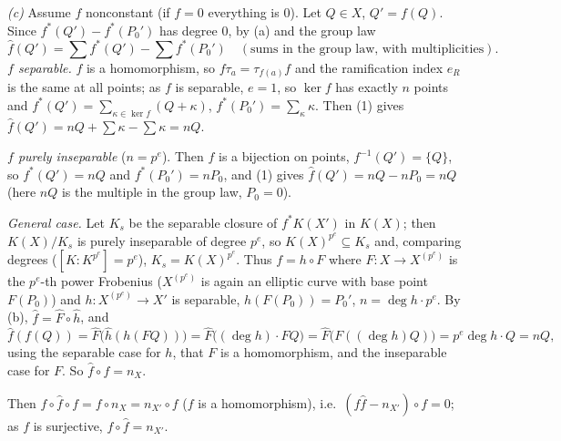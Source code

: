 \documentclass[11pt]{article}
\begin{document}
\emph{(c)} Assume $f$ nonconstant (if $f=0$ everything is $0$). Let $Q\in X$, $Q'=f(Q)$. Since $f^*(Q')-f^*(P_0')$ has degree $0$, by (a) and the group law
\[ \hat f(Q')=\sum f^*(Q')-\sum f^*(P_0')\quad(\text{sums in the group law, with multiplicities}).\tag{1}\]
\emph{$f$ separable.} $f$ is a homomorphism, so $f\tau_a=\tau_{f(a)}f$ and the ramification index $e_R$ is the same at all points; as $f$ is separable, $e=1$, so $\ker f$ has exactly $n$ points and $f^*(Q')=\sum_{\kappa\in\ker f}(Q+\kappa)$, $f^*(P_0')=\sum_{\kappa}\kappa$. Then (1) gives $\hat f(Q')=nQ+\sum\kappa-\sum\kappa=nQ$.

\emph{$f$ purely inseparable} ($n=p^e$). Then $f$ is a bijection on points, $f^{-1}(Q')=\{Q\}$, so $f^*(Q')=nQ$ and $f^*(P_0')=nP_0$, and (1) gives $\hat f(Q')=nQ-nP_0=nQ$ (here $nQ$ is the multiple in the group law, $P_0=0$).

\emph{General case.} Let $K_s$ be the separable closure of $f^*K(X')$ in $K(X)$; then $K(X)/K_s$ is purely inseparable of degree $p^e$, so $K(X)^{p^e}\subseteq K_s$ and, comparing degrees ($[K:K^{p^e}]=p^e$), $K_s=K(X)^{p^e}$. Thus $f=h\circ F$ where $F:X\to X^{(p^e)}$ is the $p^e$-th power Frobenius ($X^{(p^e)}$ is again an elliptic curve with base point $F(P_0)$) and $h:X^{(p^e)}\to X'$ is separable, $h(F(P_0))=P_0'$, $n=\deg h\cdot p^e$. By (b), $\hat f=\hat F\circ\hat h$, and
\[ \hat f(f(Q))=\hat F\bigl(\hat h(h(FQ))\bigr)=\hat F\bigl((\deg h)\cdot FQ\bigr)=\hat F\bigl(F((\deg h)Q)\bigr)=p^e\deg h\cdot Q=nQ, \]
using the separable case for $h$, that $F$ is a homomorphism, and the inseparable case for $F$. So $\hat f\circ f=n_X$.

Then $f\circ\hat f\circ f=f\circ n_X=n_{X'}\circ f$ ($f$ is a homomorphism), i.e.\ $(f\hat f-n_{X'})\circ f=0$; as $f$ is surjective, $f\circ\hat f=n_{X'}$.
\end{document}
